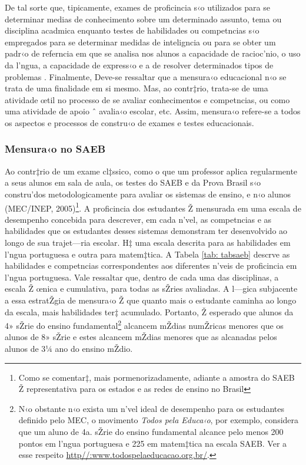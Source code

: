 \documentclass[a4paper, 12pt]{article}
\begin{document}
De tal sorte que, tipicamente, exames de proficincia s‹o utilizados para se determinar medias de conhecimento sobre um determinado assunto, tema ou disciplina acadmica enquanto testes de habilidades ou competncias s‹o empregados para se determinar medidas de inteligncia ou para se obter um padr‹o de referncia em que se analisa nos alunos a capacidade de racioc’nio, o uso da l’ngua, a capacidade de express‹o e a de resolver determinados tipos de problemas \cite{keats_causal_1988}. Finalmente, Deve-se ressaltar que a mensura‹o educacional n‹o se trata de uma finalidade em si mesmo. Mas, ao contr‡rio, trata-se de uma atividade œtil no processo de se avaliar conhecimentos e competncias, ou como uma atividade de apoio ˆ avalia‹o escolar, etc. Assim, mensura‹o refere-se a todos os aspectos e processos de constru‹o de exames e testes educacionais.

\subsubsection{Mensura‹o no SAEB}

Ao contr‡rio de um exame cl‡ssico, como o que um professor aplica regularmente a seus alunos em sala de aula, os testes do SAEB e da Prova Brasil s‹o constru’dos metodologicamente para avaliar os sistemas de ensino, e n‹o alunos (MEC/INEP, 2005)\footnote{Como se comentar‡, mais pormenorizadamente, adiante a amostra do SAEB Ž representativa para os estados e as redes de ensino no Brasil}. A proficincia dos estudantes Ž mensurada em uma escala de desempenho concebida para descrever, em cada n’vel, as competncias e as habilidades que os estudantes desses sistemas demonstram ter desenvolvido ao longo de sua trajet—ria escolar. H‡ uma escala descrita para as habilidades em l’ngua portuguesa e outra para matem‡tica. A Tabela \ref{tab: tabsaeb}  descrve as habilidades e competncias correspondentes aos diferentes n’veis de proficincia em l’ngua portuguesa. Vale ressaltar que, dentro de cada uma das disciplinas, a escala Ž œnica e cumulativa, para todas as sŽries avaliadas. A l—gica subjacente a essa estratŽgia de mensura‹o Ž que quanto mais o estudante caminha ao longo da escala, mais habilidades ter‡ acumulado. Portanto, Ž esperado que alunos da 4» sŽrie do ensino fundamental\footnote{N‹o obstante n‹o exista um n’vel ideal de desempenho para os estudantes definido pelo MEC, o movimento \emph{Todos pela Educa‹o}, por exemplo, considera que um aluno de 4a. sŽrie do ensino fundamental alcance pelo menos 200 pontos em l’ngua portuguesa e 225 em matem‡tica na escala SAEB. Ver a esse respeito \url{http//:www.todospelaeducacao.org.br/}.} alcancem mŽdias numŽricas menores que os alunos de 8» sŽrie e estes alcancem mŽdias menores que as alcanadas pelos alunos de 3¼ ano do ensino mŽdio.
\end{document}
